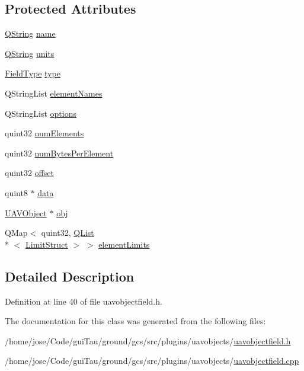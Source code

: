 \subsection*{Protected Attributes}
\begin{DoxyCompactItemize}
\item 
\hyperlink{group___u_a_v_objects_plugin_gab9d252f49c333c94a72f97ce3105a32d}{Q\-String} \hyperlink{group___u_a_v_objects_plugin_ga9909de3b60e1a954d7356cfc61357b30}{name}
\item 
\hyperlink{group___u_a_v_objects_plugin_gab9d252f49c333c94a72f97ce3105a32d}{Q\-String} \hyperlink{group___u_a_v_objects_plugin_ga1ecf5fdaab2ac408b67623d5d75368c5}{units}
\item 
\hyperlink{group___u_a_v_objects_plugin_ga74498368bc91f3ed74beacb096744cf3}{Field\-Type} \hyperlink{group___u_a_v_objects_plugin_gad84e6c3a333d2c62b5159936e42fb737}{type}
\item 
Q\-String\-List \hyperlink{group___u_a_v_objects_plugin_ga5849334da3325c4cac8625bb5910d57d}{element\-Names}
\item 
Q\-String\-List \hyperlink{group___u_a_v_objects_plugin_ga97fe1c3ed2d74eb06ea7e24abf4ce09c}{options}
\item 
quint32 \hyperlink{group___u_a_v_objects_plugin_gaa82f6e1f5deca501c58b45d902be0ef4}{num\-Elements}
\item 
quint32 \hyperlink{group___u_a_v_objects_plugin_gaed675e1711f18b1ab737f9e8e55dca35}{num\-Bytes\-Per\-Element}
\item 
quint32 \hyperlink{group___u_a_v_objects_plugin_ga8d473734be71fe3a3dbcd1a854b497f2}{offset}
\item 
quint8 $\ast$ \hyperlink{group___u_a_v_objects_plugin_gae6a068d71cfd70f70c7e6fb10f217ca5}{data}
\item 
\hyperlink{class_u_a_v_object}{U\-A\-V\-Object} $\ast$ \hyperlink{group___u_a_v_objects_plugin_ga750b9ade4270026bd2d02d37468597b5}{obj}
\item 
Q\-Map$<$ quint32, \hyperlink{class_q_list}{Q\-List}\\*
$<$ \hyperlink{struct_u_a_v_object_field_1_1_limit_struct}{Limit\-Struct} $>$ $>$ \hyperlink{group___u_a_v_objects_plugin_ga16abb7c1b891411815fe34473448b9ce}{element\-Limits}
\end{DoxyCompactItemize}


\subsection{Detailed Description}


Definition at line 40 of file uavobjectfield.\-h.



The documentation for this class was generated from the following files\-:\begin{DoxyCompactItemize}
\item 
/home/jose/\-Code/gui\-Tau/ground/gcs/src/plugins/uavobjects/\hyperlink{uavobjectfield_8h}{uavobjectfield.\-h}\item 
/home/jose/\-Code/gui\-Tau/ground/gcs/src/plugins/uavobjects/\hyperlink{uavobjectfield_8cpp}{uavobjectfield.\-cpp}\end{DoxyCompactItemize}
